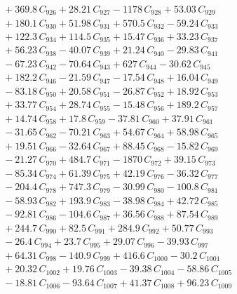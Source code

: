 \documentclass[a4paper,11pt]{article}
\begin{document}
\begin{align}
&\quad + 369.8\,C_{926} + 28.21\,C_{927} - 1178\,C_{928} + 53.03\,C_{929} \nonumber\\
&\quad + 180.1\,C_{930} + 51.98\,C_{931} + 570.5\,C_{932} - 59.24\,C_{933} \nonumber\\
&\quad + 122.3\,C_{934} + 114.5\,C_{935} + 15.47\,C_{936} + 33.23\,C_{937} \nonumber\\
&\quad + 56.23\,C_{938} - 40.07\,C_{939} + 21.24\,C_{940} - 29.83\,C_{941} \nonumber\\
&\quad - 67.23\,C_{942} - 70.64\,C_{943} + 627\,C_{944} - 30.62\,C_{945} \nonumber\\
&\quad + 182.2\,C_{946} - 21.59\,C_{947} - 17.54\,C_{948} + 16.04\,C_{949} \nonumber\\
&\quad - 83.18\,C_{950} + 20.58\,C_{951} - 26.87\,C_{952} + 18.92\,C_{953} \nonumber\\
&\quad + 33.77\,C_{954} + 28.74\,C_{955} - 15.48\,C_{956} + 189.2\,C_{957} \nonumber\\
&\quad + 14.74\,C_{958} + 17.8\,C_{959} - 37.81\,C_{960} + 37.91\,C_{961} \nonumber\\
&\quad - 31.65\,C_{962} - 70.21\,C_{963} + 54.67\,C_{964} + 58.98\,C_{965} \nonumber\\
&\quad + 19.51\,C_{966} - 32.64\,C_{967} + 88.45\,C_{968} - 15.82\,C_{969} \nonumber\\
&\quad - 21.27\,C_{970} + 484.7\,C_{971} - 1870\,C_{972} + 39.15\,C_{973} \nonumber\\
&\quad - 85.34\,C_{974} + 61.39\,C_{975} + 42.19\,C_{976} - 36.32\,C_{977} \nonumber\\
&\quad - 204.4\,C_{978} + 747.3\,C_{979} - 30.99\,C_{980} - 100.8\,C_{981} \nonumber\\
&\quad - 58.93\,C_{982} + 193.9\,C_{983} - 38.98\,C_{984} + 42.72\,C_{985} \nonumber\\
&\quad - 92.81\,C_{986} - 104.6\,C_{987} + 36.56\,C_{988} + 87.54\,C_{989} \nonumber\\
&\quad + 244.7\,C_{990} + 82.5\,C_{991} + 284.9\,C_{992} + 50.77\,C_{993} \nonumber\\
&\quad - 26.4\,C_{994} + 23.7\,C_{995} + 29.07\,C_{996} - 39.93\,C_{997} \nonumber\\
&\quad + 64.31\,C_{998} - 140.9\,C_{999} + 416.6\,C_{1000} - 30.2\,C_{1001} \nonumber\\
&\quad + 20.32\,C_{1002} + 19.76\,C_{1003} - 39.38\,C_{1004} - 58.86\,C_{1005} \nonumber\\
&\quad - 18.81\,C_{1006} - 93.64\,C_{1007} + 41.37\,C_{1008} + 96.23\,C_{1009} \nonumber\\

\end{align}
\end{document}
